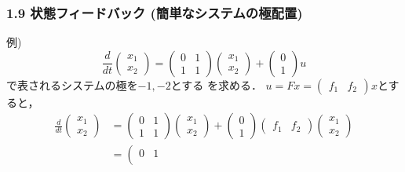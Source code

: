 \begin{frame}[t]
\frametitle{1.9 状態フィードバック (簡単なシステムの極配置)}
例)
\begin{equation}
 \frac{d}{dt}
 \left(
 \begin{array}{c}
  x_1 \\
  x_2
 \end{array}
 \right) =
 \left(
 \begin{array}{cc}
  0 & 1\\
  1 & 1
 \end{array}
 \right)
 \left(
 \begin{array}{c}
  x_1 \\
  x_2
 \end{array}
 \right) +
 \left(
 \begin{array}{c}
  0 \\
  1
 \end{array}
 \right) u
\end{equation}
で表されるシステムの極を$-1, -2$とする を求める．
$u = Fx = (\begin{array}{cc}f_1 & f_2\end{array})x$とすると，
\begin{align}
 \frac{d}{dt}
 \left(
 \begin{array}{c}
  x_1 \\
  x_2
 \end{array}
 \right)
 &=
 \left(
 \begin{array}{cc}
  0 & 1\\
  1 & 1
 \end{array}
 \right)
 \left(
 \begin{array}{c}
  x_1 \\
  x_2
 \end{array}
 \right) +
 \left(
 \begin{array}{c}
  0 \\
  1
 \end{array}
 \right)
 \left(
 \begin{array}{cc}
  f_1 & f_2
 \end{array}
 \right)
 \left(
 \begin{array}{c}
  x_1 \\
  x_2
 \end{array}
 \right)
\nonumber \\
 &=
 \left(
 \begin{array}{cc}
  0 & 1\\

\end{array}
\end{align}
\end{frame}
